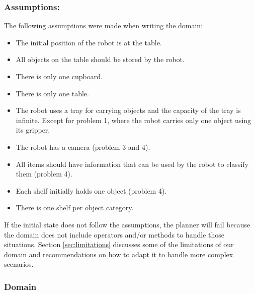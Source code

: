 \documentclass[paper=a4, fontsize=11pt]{scrartcl}
\begin{document}
	\subsubsection*{Assumptions:}
	
	The following assumptions were made when writing the domain:
	
	\begin{itemize}
		\item The initial position of the robot is at the table.
		\item All objects on the table should be stored by the robot.
		\item There is only one cupboard.
		\item There is only one table.
		\item The robot uses a tray for carrying objects and the capacity of the tray is infinite. Except for problem 1, where the robot carries only one object using its gripper.
		\item The robot has a camera (problem 3 and 4).
		\item All items should have information that can be used by the robot to classify them (problem 4).		
		\item Each shelf initially holds one object (problem 4).
		\item There is one shelf per object category. 
	\end{itemize}
	
	If the initial state does not follow the assumptions, the planner will fail because the domain does not include operators and/or methods to handle those situations. Section \ref{sec:limitations} discusses some of the limitations of our domain and recommendations on how to adapt it to handle more complex scenarios.
	
	\subsubsection*{Domain}
	
\end{document}
